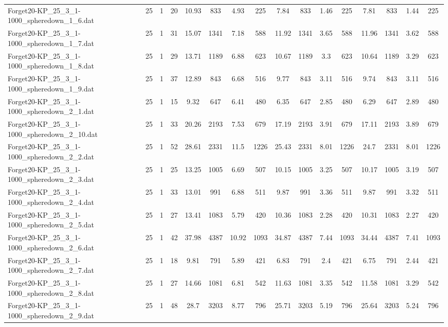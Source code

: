 \begin{sidewaystable}[!ht]
{\begin{tabular}{lccccccccccccccc}
Forget20-KP\_25\_3\_1-1000\_spheredown\_1\_6.dat & 25 & 1 & 20 & 10.93 & 833 & 4.93 & 225 & 7.84 & 833 & 1.46 & 225 & 7.81 & 833 &  \textcolor{blue2}{1.44} & 225 \\
Forget20-KP\_25\_3\_1-1000\_spheredown\_1\_7.dat & 25 & 1 & 31 & 15.07 & 1341 & 7.18 & 588 & 11.92 & 1341 & 3.65 & 588 & 11.96 & 1341 & 3.62 & 588 \\
Forget20-KP\_25\_3\_1-1000\_spheredown\_1\_8.dat & 25 & 1 & 29 & 13.71 & 1189 & 6.88 & 623 & 10.67 & 1189 & 3.3 & 623 & 10.64 & 1189 & 3.29 & 623 \\
Forget20-KP\_25\_3\_1-1000\_spheredown\_1\_9.dat & 25 & 1 & 37 & 12.89 & 843 & 6.68 & 516 & 9.77 & 843 & 3.11 & 516 & 9.74 & 843 & 3.11 & 516 \\
Forget20-KP\_25\_3\_1-1000\_spheredown\_2\_1.dat & 25 & 1 & 15 & 9.32 & 647 & 6.41 & 480 & 6.35 & 647 & 2.85 & 480 & 6.29 & 647 & 2.89 & 480 \\
Forget20-KP\_25\_3\_1-1000\_spheredown\_2\_10.dat & 25 & 1 & 33 & 20.26 & 2193 & 7.53 & 679 & 17.19 & 2193 & 3.91 & 679 & 17.11 & 2193 & 3.89 & 679 \\
Forget20-KP\_25\_3\_1-1000\_spheredown\_2\_2.dat & 25 & 1 & 52 & 28.61 & 2331 & 11.5 & 1226 & 25.43 & 2331 & 8.01 & 1226 & 24.7 & 2331 & 8.01 & 1226 \\
Forget20-KP\_25\_3\_1-1000\_spheredown\_2\_3.dat & 25 & 1 & 25 & 13.25 & 1005 & 6.69 & 507 & 10.15 & 1005 & 3.25 & 507 & 10.17 & 1005 & 3.19 & 507 \\
Forget20-KP\_25\_3\_1-1000\_spheredown\_2\_4.dat & 25 & 1 & 33 & 13.01 & 991 & 6.88 & 511 & 9.87 & 991 & 3.36 & 511 & 9.87 & 991 & 3.32 & 511 \\
Forget20-KP\_25\_3\_1-1000\_spheredown\_2\_5.dat & 25 & 1 & 27 & 13.41 & 1083 & 5.79 & 420 & 10.36 & 1083 & 2.28 & 420 & 10.31 & 1083 & 2.27 & 420 \\
Forget20-KP\_25\_3\_1-1000\_spheredown\_2\_6.dat & 25 & 1 & 42 & 37.98 & 4387 & 10.92 & 1093 & 34.87 & 4387 & 7.44 & 1093 & 34.44 & 4387 & 7.41 & 1093 \\
Forget20-KP\_25\_3\_1-1000\_spheredown\_2\_7.dat & 25 & 1 & 18 & 9.81 & 791 & 5.89 & 421 & 6.83 & 791 &  \textcolor{blue2}{2.4} & 421 & 6.75 & 791 & 2.44 & 421 \\
Forget20-KP\_25\_3\_1-1000\_spheredown\_2\_8.dat & 25 & 1 & 27 & 14.66 & 1081 & 6.81 & 542 & 11.63 & 1081 & 3.35 & 542 & 11.58 & 1081 &  \textcolor{blue2}{3.29} & 542 \\
Forget20-KP\_25\_3\_1-1000\_spheredown\_2\_9.dat & 25 & 1 & 48 & 28.7 & 3203 & 8.77 & 796 & 25.71 & 3203 & 5.19 & 796 & 25.64 & 3203 & 5.24 & 796 \\

\end{tabular}}
\end{sidewaystable}
